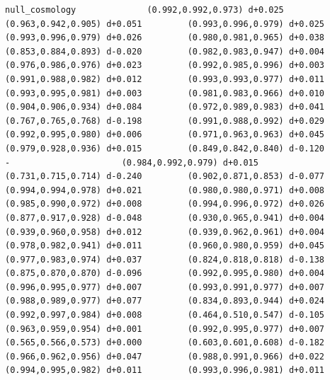 \documentclass[11pt, letterpaper, openany]{book}
\begin{document}
\begin{empiricalbox}
\begin{lstlisting}[style=terminal]
null_cosmology              (0.992,0.992,0.973) d+0.025         (0.963,0.942,0.905) d+0.051         (0.993,0.996,0.979) d+0.025         (0.993,0.996,0.979) d+0.026         (0.980,0.981,0.965) d+0.038         (0.853,0.884,0.893) d-0.020         (0.982,0.983,0.947) d+0.004         (0.976,0.986,0.976) d+0.023         (0.992,0.985,0.996) d+0.003         (0.991,0.988,0.982) d+0.012         (0.993,0.993,0.977) d+0.011         (0.993,0.995,0.981) d+0.003         (0.981,0.983,0.966) d+0.010         (0.904,0.906,0.934) d+0.084         (0.972,0.989,0.983) d+0.041         (0.767,0.765,0.768) d-0.198         (0.991,0.988,0.992) d+0.029         (0.992,0.995,0.980) d+0.006         (0.971,0.963,0.963) d+0.045         (0.979,0.928,0.936) d+0.015         (0.849,0.842,0.840) d-0.120                      -                      (0.984,0.992,0.979) d+0.015         (0.731,0.715,0.714) d-0.240         (0.902,0.871,0.853) d-0.077         (0.994,0.994,0.978) d+0.021         (0.980,0.980,0.971) d+0.008         (0.985,0.990,0.972) d+0.008         (0.994,0.996,0.972) d+0.026         (0.877,0.917,0.928) d-0.048         (0.930,0.965,0.941) d+0.004         (0.939,0.960,0.958) d+0.012         (0.939,0.962,0.961) d+0.004         (0.978,0.982,0.941) d+0.011         (0.960,0.980,0.959) d+0.045         (0.977,0.983,0.974) d+0.037         (0.824,0.818,0.818) d-0.138         (0.875,0.870,0.870) d-0.096         (0.992,0.995,0.980) d+0.004         (0.996,0.995,0.977) d+0.007         (0.993,0.991,0.977) d+0.007         (0.988,0.989,0.977) d+0.077         (0.834,0.893,0.944) d+0.024         (0.992,0.997,0.984) d+0.008         (0.464,0.510,0.547) d-0.105         (0.963,0.959,0.954) d+0.001         (0.992,0.995,0.977) d+0.007         (0.565,0.566,0.573) d+0.000         (0.603,0.601,0.608) d-0.182         (0.966,0.962,0.956) d+0.047         (0.988,0.991,0.966) d+0.022         (0.994,0.995,0.982) d+0.011         (0.993,0.996,0.981) d+0.011     

\end{lstlisting}
\end{empiricalbox}
\end{document}

